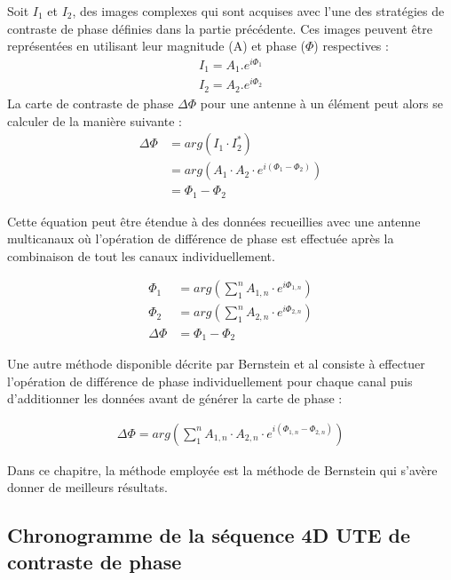 Soit $I_1$ et $I_2$, des images complexes qui sont acquises avec l'une des stratégies de contraste de phase définies dans la partie précédente. Ces images peuvent être représentées en utilisant leur magnitude (A) et phase ($\Phi$) respectives :
\begin{equation}
\begin{split}
I_1= A_1 . e^{i \Phi_1} \\
I_2= A_2 . e^{i \Phi_2}
\end{split}
\end{equation}
La carte de contraste de phase $\Delta \Phi$ pour une antenne à un élément peut alors se calculer de la manière suivante :
\begin{equation}
\begin{split}
\Delta \Phi &= arg(I_1 \cdot I_2^*) \\
				  &= arg(A_1 \cdot A_2 \cdot e^{i(\Phi_1 - \Phi_2)}) \\
				  &= \Phi_1-\Phi_2
\end{split}
\end{equation}

Cette équation peut être étendue à des données recueillies avec une antenne multicanaux où l'opération de différence de phase est effectuée après la combinaison de tout les canaux individuellement.

\begin{equation}
\begin{split}
\Phi_1 &= arg( \sum_1^n  A_{1,n} \cdot e^{i \Phi_{1,n}}) \\
\Phi_2 &= arg( \sum_1^n  A_{2,n} \cdot e^{i \Phi_{2,n}}) \\
\Delta \Phi &= \Phi_1 - \Phi_2
\end{split}
\end{equation}

Une autre méthode disponible décrite par Bernstein et al \cite{bernstein1994reconstructions} consiste à effectuer l'opération de différence de phase individuellement pour chaque canal puis d'additionner les données avant de générer la carte de phase :

\begin{align}
\Delta \Phi = arg(\sum_1^n A_{1,n} \cdot A_{2,n} \cdot e^{i(\Phi_{1,n} - \Phi_{2,n})})
\end{align}

Dans ce chapitre, la méthode employée est la méthode de Bernstein qui s'avère donner de meilleurs résultats.

\subsection{Chronogramme de la séquence 4D UTE de contraste de phase}

